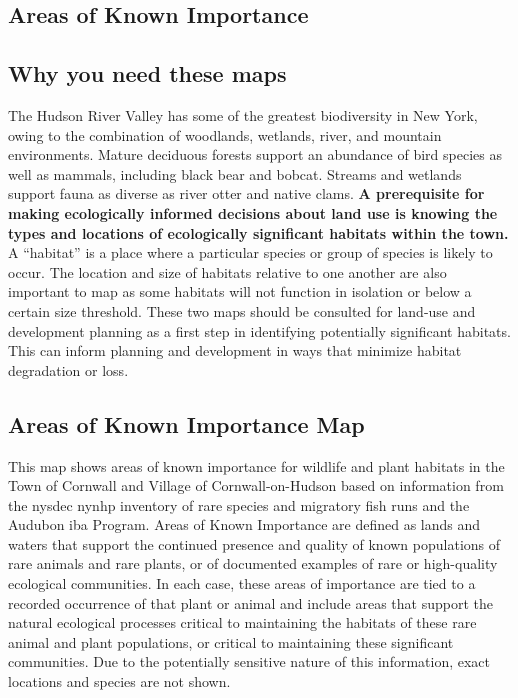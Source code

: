 \subsection{Areas of Known Importance}\label{subsec:areasofknownimportance}
\subsection*{Why you need these maps} 
The Hudson River Valley has some of the greatest biodiversity in New York, 
owing to the combination of woodlands, wetlands, river, and mountain 
environments.  Mature deciduous forests support an abundance of bird species as 
well as mammals, including black bear and bobcat. Streams and wetlands support 
fauna as diverse as river otter and native clams. \textbf{A 
prerequisite for making ecologically informed decisions about land use is 
knowing the types and locations of ecologically significant habitats within the 
town.} A ``habitat'' is a place where a particular species or group of species 
is likely to occur. The location and size of habitats relative to one another 
are also important to map as some habitats will not function in isolation or 
below a certain size threshold. These two maps should be consulted for land-use 
and development planning as a first step in identifying potentially significant 
habitats. This can inform planning and development in ways that minimize 
habitat degradation or loss.
\par
\subsection*{Areas of Known Importance Map}\label{subsec:aokimportancemap}
This map shows areas of known importance for wildlife and plant habitats in the
Town of Cornwall and Village of Cornwall-on-Hudson based on information from
the \gls{nysdec} \gls{nynhp} inventory of rare species and migratory fish runs
and the Audubon \gls{iba} Program. Areas of Known Importance are defined as
lands and waters that support the continued presence and quality of known
populations of rare animals and rare plants, or of documented examples of rare
or high-quality ecological communities. In each case, these areas of importance
are tied to a recorded occurrence of that plant or animal and include areas
that support the natural ecological processes critical to maintaining the
habitats of these rare animal and plant populations, or critical to maintaining
these significant communities. Due to the potentially sensitive nature of this
information, exact locations and species are not shown. 
